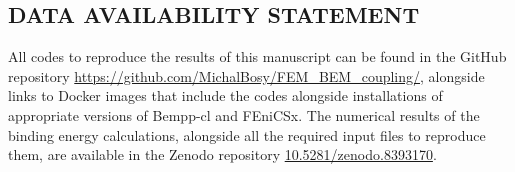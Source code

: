 \documentclass[12pt]{article}
\begin{document}
\subsection*{\sffamily \large DATA AVAILABILITY STATEMENT}
All codes to reproduce the results of this manuscript can be found in the GitHub repository \url{https://github.com/MichalBosy/FEM_BEM_coupling/}, alongside links to Docker images
that include the codes alongside installations of appropriate versions of Bempp-cl and FEniCSx.
The numerical results of the binding energy calculations, alongside all the required input files to reproduce them, are available in the Zenodo repository \url{10.5281/zenodo.8393170}.


\clearpage



%
%


\end{document}
